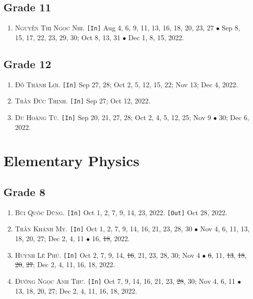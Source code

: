 \documentclass{article}
\numberwithin{equation}{section}
\begin{document}
\subsection{Grade 11}
\begin{enumerate}
	\item \textsc{Nguyễn Thị Ngọc Nhi.} \texttt{[In]} Aug 4, 6, 9, 11, 13, 16, 18, 20, 23, 27 $\bullet$ Sep 8, 15, 17, 22, 23, 29, 30; Oct 8, 13, 31 $\bullet$ Dec 1, 8,  15, 2022.
\end{enumerate}

\subsection{Grade 12}
\begin{enumerate}
	\item \textsc{Đỗ Thành Lợi.} \texttt{[In]} Sep 27, 28; Oct 2, 5, 12, 15, 22; Nov 13; Dec 4, 2022.
	\item \textsc{Trần Đức Thịnh.} \texttt{[In]} Sep 27; Oct 12, 2022.
	\item \textsc{Du Hoàng Tú.} \texttt{[In]} Sep 20, 21, 27, 28; Oct 2, 4, 5, 12, 25; Nov 9 $\bullet$ 30; Dec 6, 2022.
\end{enumerate}


\section{Elementary Physics}

\subsection{Grade 8}
\begin{enumerate}
	\item \textsc{Bùi Quốc Dũng.} \texttt{[In]} Oct 1, 2, 7, 9, 14, 23, 2022. \texttt{[Out]} Oct 28, 2022.
	\item \textsc{Trần Khánh My.} \texttt{[In]} Oct 1, 2, 7, 9, 14, 16, 21, 23, 28, 30 $\bullet$ Nov 4, 6, 11, 13, 18, 20, 27; Dec 2, 4, 11 $\bullet$ 16, \st{18}, 2022.
	\item \textsc{Huỳnh Lê Phú.} \texttt{[In]} Oct 2, 7, 9, 14, \st{16}, 21, 23, 28, 30; Nov 4 $\bullet$ \st{6}, 11, \st{13}, \st{18}, \st{20}, \st{27}; Dec 2, 4, 11, 16, 18, 2022.
	\item \textsc{Đường Ngọc Anh Thư.} \texttt{[In]} Oct 7, 9, 14, 16, 21, 23, \st{28}, 30; Nov 4, 6, 11 $\bullet$ 13, 18, 20, 27; Dec 2, 4, 11, 16, 18, 2022.
\end{enumerate}
\end{document}
